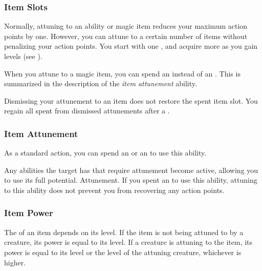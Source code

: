         \subsubsection{Item Slots}\label{Item Slots}
            Normally, attuning to an ability or magic item reduces your maximum action points by one.
            However, you can attune to a certain number of items without penalizing your action points.
            You start with one , and acquire more as you gain levels (see ).

            When you attune to a magic item, you can spend an  instead of an .
            This is summarized in the description of the \textit{item attunement} ability.

            Dismissing your attunement to an item does not restore the spent item slot.
            You regain all spent  from dismissed attunements after a .

        \subsubsection{Item Attunement}
            As a standard action, you can spend an  or an  to use this ability.
            \begin{ability}
                \begin{spelltargetinginfo}
                \end{spelltargetinginfo}
                \begin{spelleffects}
                    \spelleffect Any abilities the target has that require attunement become active, allowing you to use its full potential.
                    \spelldur Attunement. If you spent an  to use this ability, attuning to this ability does not prevent you from recovering any action points.
                \end{spelleffects}
            \end{ability}

    \subsubsection{Item Power}\label{Item Power}
        The  of an item depends on its level.
        If the item is not being attuned to by a creature, its power is equal to its level.
        If a creature is attuning to the item, its power is equal to its level or the level of the attuning creature, whichever is higher.

